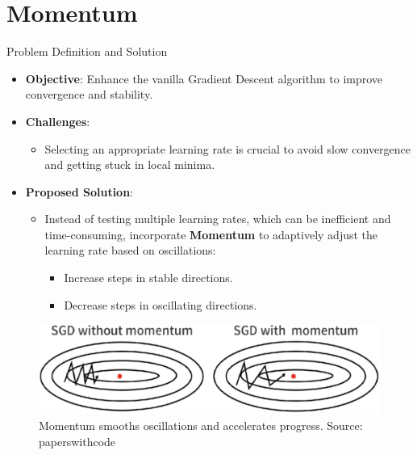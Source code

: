 \documentclass[serif, aspectratio=169]{beamer}
\begin{document}
\section{Momentum}
\begin{frame}{Problem Definition and Solution}
    \begin{minipage}{0.6\textwidth}
    \begin{itemize}
        \item \textbf{Objective}: Enhance the vanilla Gradient Descent algorithm to improve convergence and stability.
        \item \textbf{Challenges}:
        \begin{itemize}
            \item Selecting an appropriate learning rate is crucial to avoid slow convergence and getting stuck in local minima.
        \end{itemize}
        \item \textbf{Proposed Solution}:
        \begin{itemize}
            \item Instead of testing multiple learning rates, which can be inefficient and time-consuming, incorporate \textbf{Momentum} to adaptively adjust the learning rate based on oscillations:
            \begin{itemize}
                \item Increase steps in stable directions.
                \item Decrease steps in oscillating directions.
            \end{itemize}
        \end{itemize}
    \end{itemize}
    \end{minipage}%
    \begin{minipage}{0.3\textwidth}
        \begin{figure}[h]
        \centering
        \includegraphics[height=0.2\textheight]{pic/momentum_paperswithcode.jpg}
        \caption{\footnotesize Momentum smooths oscillations and accelerates progress. Source: paperswithcode}
        \end{figure}
    \end{minipage}
\end{frame}
\end{document}
